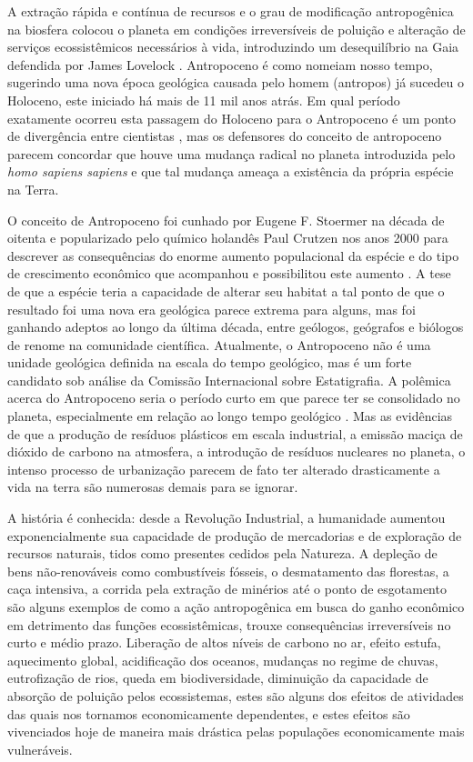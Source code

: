 \documentclass[
article,			%
11pt,				%
oneside,			%
a4paper,			%
english,			%
brazil,				%
sumario=tradicional
]{abntex2}
\begin{document}
	A extração rápida e contínua de recursos e o grau de modificação antropogênica na biosfera colocou o planeta em condições irreversíveis de poluição e alteração de serviços ecossistêmicos necessários à vida, introduzindo um desequilíbrio na Gaia defendida por James Lovelock . Antropoceno é como nomeiam nosso tempo, sugerindo uma nova época geológica causada pelo homem (antropos) já sucedeu o Holoceno, este iniciado há mais de 11 mil anos atrás. Em qual período exatamente ocorreu esta passagem do Holoceno para o Antropoceno é um ponto de divergência entre cientistas \cite[p.3]{hamilton2016a}, mas os defensores do conceito de antropoceno parecem concordar que houve uma mudança radical no planeta introduzida pelo \textit{homo sapiens sapiens} e que tal mudança ameaça a existência da própria espécie na Terra.
	
	O conceito de Antropoceno foi cunhado por Eugene F. Stoermer na década de oitenta e popularizado pelo químico holandês Paul Crutzen nos anos 2000 para descrever as consequências do enorme aumento populacional da espécie e do tipo de crescimento econômico que acompanhou e possibilitou este aumento \cite{crutzen2006a}. A tese de que a espécie teria a capacidade de alterar seu habitat a tal ponto de que o resultado foi uma nova era geológica parece extrema para alguns, mas foi ganhando adeptos ao longo da última década, entre geólogos, geógrafos e biólogos de renome na comunidade científica.  Atualmente, o Antropoceno não é uma unidade geológica definida na escala do tempo geológico, mas é um forte candidato sob análise da Comissão Internacional sobre Estatigrafia.  A polêmica acerca do Antropoceno seria o período curto em que parece ter se consolidado no planeta, especialmente em relação ao longo tempo geológico \cite{sqs0000a}. Mas as evidências de que a produção de resíduos plásticos em escala industrial, a emissão maciça de dióxido de carbono na atmosfera, a introdução de resíduos nucleares no planeta, o intenso processo de urbanização parecem de fato ter alterado drasticamente a vida na terra são numerosas demais para se ignorar. 
	
	A história é conhecida: desde a Revolução Industrial, a humanidade aumentou exponencialmente sua capacidade de produção de mercadorias e de exploração de recursos naturais, tidos como presentes cedidos pela Natureza. A depleção de bens não-renováveis como combustíveis fósseis, o desmatamento das florestas, a caça intensiva, a corrida pela extração de minérios até o ponto de esgotamento são alguns exemplos de como a ação antropogênica em busca do ganho econômico em detrimento das funções ecossistêmicas, trouxe consequências irreversíveis no curto e médio prazo. Liberação de altos níveis de carbono no ar, efeito estufa, aquecimento global, acidificação dos oceanos, mudanças no regime de chuvas, eutrofização de rios, queda em biodiversidade, diminuição da capacidade de absorção de poluição pelos ecossistemas, estes são alguns dos efeitos de atividades das quais nos tornamos economicamente dependentes, e estes efeitos são vivenciados hoje de maneira mais drástica pelas populações economicamente mais vulneráveis.
	
\end{document}
